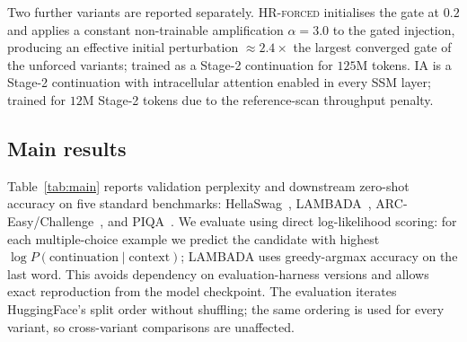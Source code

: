 Two further variants are reported separately. \textsc{HR-forced} initialises the gate at $0.2$ and applies a constant non-trainable amplification $\alpha = 3.0$ to the gated injection, producing an effective initial perturbation $\approx 2.4\times$ the largest converged gate of the unforced variants; trained as a Stage-2 continuation for $125$M tokens. \textsc{IA} is a Stage-2 continuation with intracellular attention enabled in every SSM layer; trained for $12$M Stage-2 tokens due to the reference-scan throughput penalty.

\subsection{Main results}

Table~\ref{tab:main} reports validation perplexity and downstream zero-shot accuracy on five standard benchmarks: HellaSwag~\citep{zellers2019hellaswag}, LAMBADA~\citep{paperno2016lambada}, ARC-Easy/Challenge~\citep{clark2018think}, and PIQA~\citep{bisk2020piqa}. We evaluate using direct log-likelihood scoring: for each multiple-choice example we predict the candidate with highest $\log P(\text{continuation} \mid \text{context})$; LAMBADA uses greedy-argmax accuracy on the last word. This avoids dependency on evaluation-harness versions and allows exact reproduction from the model checkpoint. The evaluation iterates HuggingFace's split order without shuffling; the same ordering is used for every variant, so cross-variant comparisons are unaffected.

